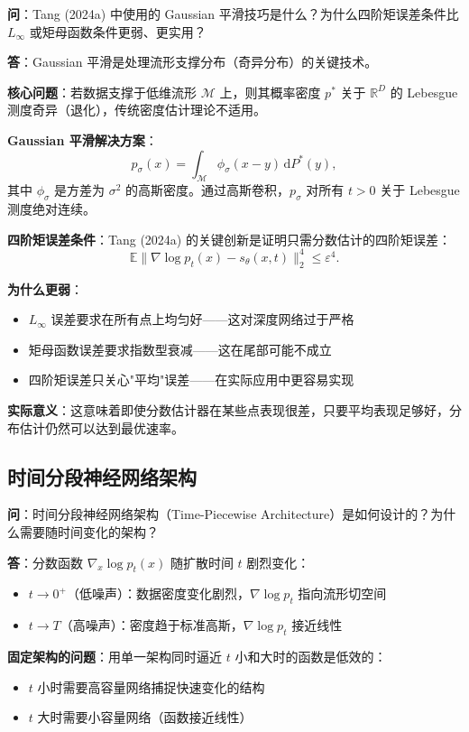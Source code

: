 \textbf{问}：Tang (2024a) 中使用的 Gaussian 平滑技巧是什么？为什么四阶矩误差条件比 $L_\infty$ 或矩母函数条件更弱、更实用？

\textbf{答}：Gaussian 平滑是处理流形支撑分布（奇异分布）的关键技术。

\textbf{核心问题}：若数据支撑于低维流形 $\mathcal{M}$ 上，则其概率密度 $p^*$ 关于 $\mathbb{R}^D$ 的 Lebesgue 测度奇异（退化），传统密度估计理论不适用。

\textbf{Gaussian 平滑解决方案}：
\[
p_\sigma(x) = \int_{\mathcal{M}} \phi_\sigma(x-y) \, \mathrm{d}P^*(y),
\]
其中 $\phi_\sigma$ 是方差为 $\sigma^2$ 的高斯密度。通过高斯卷积，$p_\sigma$ 对所有 $t > 0$ 关于 Lebesgue 测度绝对连续。

\textbf{四阶矩误差条件}：Tang (2024a) 的关键创新是证明只需分数估计的四阶矩误差：
\[
\mathbb{E}\|\nabla \log p_t(x) - s_\theta(x, t)\|_2^4 \leq \varepsilon^4.
\]

\textbf{为什么更弱}：
\begin{itemize}
    \item $L_\infty$ 误差要求在所有点上均匀好——这对深度网络过于严格
    \item 矩母函数误差要求指数型衰减——这在尾部可能不成立
    \item 四阶矩误差只关心"平均"误差——在实际应用中更容易实现
\end{itemize}

\textbf{实际意义}：这意味着即使分数估计器在某些点表现很差，只要平均表现足够好，分布估计仍然可以达到最优速率。

\subsection{时间分段神经网络架构}\label{sec:qa-timepiece-network}

\textbf{问}：时间分段神经网络架构（Time-Piecewise Architecture）是如何设计的？为什么需要随时间变化的架构？

\textbf{答}：分数函数 $\nabla_x \log p_t(x)$ 随扩散时间 $t$ 剧烈变化：

\begin{itemize}
    \item $t \to 0^+$（低噪声）：数据密度变化剧烈，$\nabla \log p_t$ 指向流形切空间
    \item $t \to T$（高噪声）：密度趋于标准高斯，$\nabla \log p_t$ 接近线性
\end{itemize}

\textbf{固定架构的问题}：用单一架构同时逼近 $t$ 小和大时的函数是低效的：
\begin{itemize}
    \item $t$ 小时需要高容量网络捕捉快速变化的结构
    \item $t$ 大时需要小容量网络（函数接近线性）
\end{itemize}

